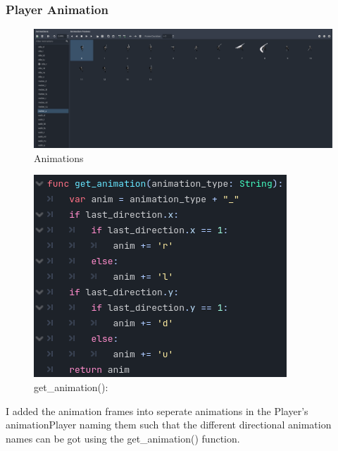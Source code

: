\documentclass{article}
\begin{document}
        \subsubsection{Player Animation}
        \begin{multicols}{2}
        \begin{figure}[H]
                \centering
                \includegraphics[width = 1.1\columnwidth]{images/development/Animations.PNG}
                \caption{Animations}
        \end{figure}
        \begin{figure}[H]
                \centering
                \includegraphics[width = 0.8\columnwidth]{images/development/Player_get_anim.PNG}
                \caption{get\_animation():}
        \end{figure}
        \end{multicols}
        I added the animation frames into seperate animations in the Player's animationPlayer naming them such that the different directional animation names can be got using the get\_animation() function.\\
\end{document}
